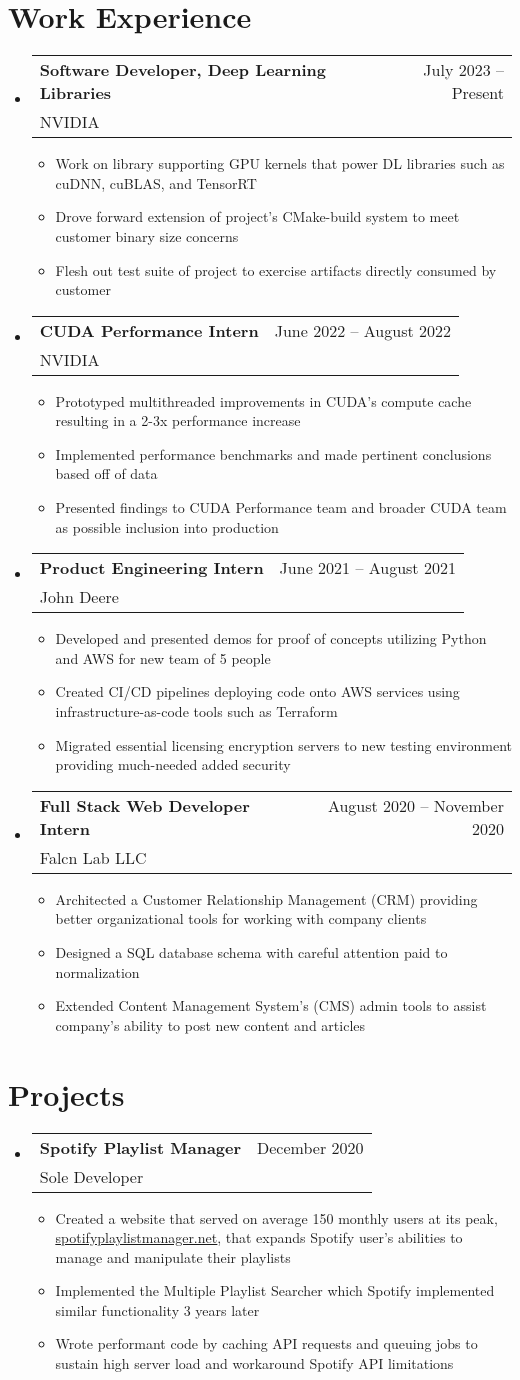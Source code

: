 \documentclass[letterpaper,12pt]{article} %
\makeatletter
\newcommand{\CVItem}[1]{
  \item\small{
    {#1 \vspace{-2pt}}
  }
}
\newcommand{\CVSubheading}[4]{
  \vspace{-2pt}\item
    \begin{tabular*}{0.97\textwidth}[t]{l@{\extracolsep{\fill}}r}
      \textbf{#1} & #2 \\
      \small#3 & \small #4 \\
    \end{tabular*}\vspace{-7pt}
}
\newcommand{\CVSubHeadingListStart}{\begin{itemize}[leftmargin=0.15in, label={}]} %
\newcommand{\CVSubHeadingListEnd}{\end{itemize}}
\newcommand{\CVItemListStart}{\begin{itemize}}
\newcommand{\CVItemListEnd}{\end{itemize}\vspace{-5pt}}
\makeatother
\begin{document}
\section{Work Experience}
\CVSubHeadingListStart
\CVSubheading
{Software Developer, Deep Learning Libraries}{July 2023 -- Present}
{NVIDIA}{}
\CVItemListStart
\CVItem{Work on library supporting GPU kernels that power DL libraries such as cuDNN, cuBLAS, and TensorRT}
\CVItem{Drove forward extension of project's CMake-build system to meet customer binary size concerns}
\CVItem{Flesh out test suite of project to exercise artifacts directly consumed by customer}
\CVItemListEnd
\CVSubheading
{CUDA Performance Intern}{June 2022 -- August 2022}
{NVIDIA}{}
\CVItemListStart
\CVItem{Prototyped multithreaded improvements in CUDA's compute cache resulting in a 2-3x performance increase}
\CVItem{Implemented performance benchmarks and made pertinent conclusions based off of data}
\CVItem{Presented findings to CUDA Performance team and broader CUDA team as possible inclusion into production}
\CVItemListEnd
\CVSubheading
{Product Engineering Intern}{June 2021 -- August 2021}
{John Deere}{}
\CVItemListStart
\CVItem{Developed and presented demos for proof of concepts utilizing Python and AWS for new team of 5 people}
\CVItem{Created CI/CD pipelines deploying code onto AWS services using infrastructure-as-code tools such as Terraform}
\CVItem{Migrated essential licensing encryption servers to new testing environment providing much-needed added security}
\CVItemListEnd
\CVSubheading
{Full Stack Web Developer Intern}{August 2020 -- November 2020}
{Falcn Lab LLC}{}
\CVItemListStart
\CVItem{Architected a Customer Relationship Management (CRM) providing better organizational tools for working with company clients}
\CVItem{Designed a SQL database schema with careful attention paid to normalization}
\CVItem{Extended Content Management System's (CMS) admin tools to assist company's ability to post new content and articles}
\CVItemListEnd
\CVSubHeadingListEnd

\vspace{-10pt} %
\section{Projects}
\CVSubHeadingListStart
\CVSubheading
{Spotify Playlist Manager}{December 2020}
{Sole Developer}{}
\CVItemListStart
\CVItem{Created a website that served on average 150 monthly users at its peak, \href{www.spotifyplaylistmanager.net}{\underline{spotifyplaylistmanager.net}},
  that expands Spotify user's abilities to manage and manipulate their playlists}
\CVItem{Implemented the Multiple Playlist Searcher which Spotify implemented similar functionality 3 years later}
\CVItem{Wrote performant code by caching API requests and queuing jobs to sustain high server load and workaround Spotify API limitations}
\CVItemListEnd
\CVSubHeadingListEnd
\end{document}
